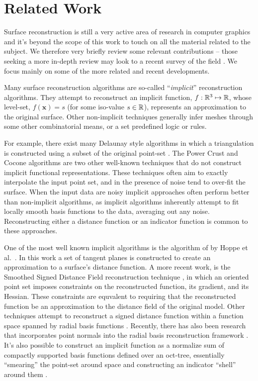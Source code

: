 \section{Related Work}
Surface reconstruction is still a very active area of research in computer 
graphics and it's beyond the scope of this work to touch on all the material 
related to the subject. We therefore very briefly review some relevant contributions -- 
those seeking a more in-depth review may look to a recent survey of the field 
\cite{reconstar_eg14}. We focus mainly on some of the more related and recent 
developments. 

Many surface reconstruction algorithms are so-called 
``\emph{implicit}'' reconstruction algorithms. They attempt to 
reconstruct an implicit function, $f : \mathbb{R}^3 \mapsto \mathbb{R} $, whose 
level-set, $f(\mathbf{x})=s$ (for some iso-value $s \in \mathbb{R}$), represents an
approximation to the original surface. Other non-implicit techniques
generally infer meshes through some other combinatorial means, 
or a set predefined logic or rules.

For example, there exist many Delaunay style algorithms in which a 
triangulation is constructed using a subset of the original point-set 
\cite{delaunay}. The Power Crust \cite{powercrust} and Cocone \cite{cocone} 
algorithms are two other well-known techniques that do not construct 
implicit functional representations. These techniques
often aim to exactly interpolate the input point set, and in the presence of
noise tend to over-fit the surface. When the input data are noisy
implicit approaches often perform better than non-implicit algorithms, 
as implicit algorithms inherently attempt to fit locally smooth basis 
functions to the data, averaging out any noise. Reconstructing either 
a distance function or an indicator function is common to these 
approaches.

One of the most well known implicit algorithms is the algorithm of 
by Hoppe et al.~\cite{hoppecut}. In this work a set of
tangent planes is constructed to create an approximation to a
surface's distance function. A more recent work, is the Smoothed
Signed Distance Field reconstruction technique \cite{ssdrecon}, in
which an oriented point set imposes constraints on the reconstructed
function, its gradient, and its Hessian. These constraints are
equvalent to requiring that the reconstructed function be an
approximation to the distance field of the original model. Other
techniques attempt to reconstruct a signed distance function within a
function space spanned by radial basis functions \cite{radial}.
Recently, there has also been research that incorporates point normals
into the radial basis reconstruction framework \cite{hermite}. It's also
possible to construct an implicit function as a normalize sum of 
compactly supported basis functions defined over an oct-tree, 
essentially ``smearing'' the point-set around space and constructing 
an indicator ``shell'' around them \cite{Fuhrmann2014}.


